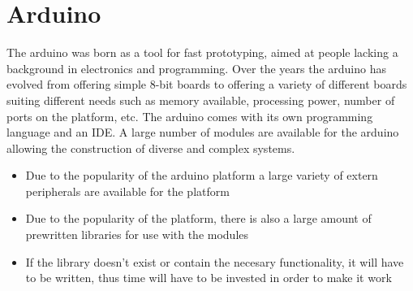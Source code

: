 \section{Arduino}
The arduino was born as a tool for fast prototyping, aimed at people lacking a background in electronics and programming. Over the years the arduino has evolved from offering simple 8-bit boards to offering a variety of different boards suiting different needs such as memory available, processing power, number of ports on the platform, etc. The arduino comes with its own programming language and an IDE. A large number of modules are available for the arduino allowing the construction of diverse and complex systems.
\begin{itemize}
	\item Due to the popularity of the arduino platform a large variety of extern peripherals are available for the platform
	\item Due to the popularity of the platform, there is also a large amount of prewritten libraries for use with the modules
	\item If the library doesn't exist or contain the necesary functionality, it will have to be written, thus time will have to be invested in order to make it work
\end{itemize}
